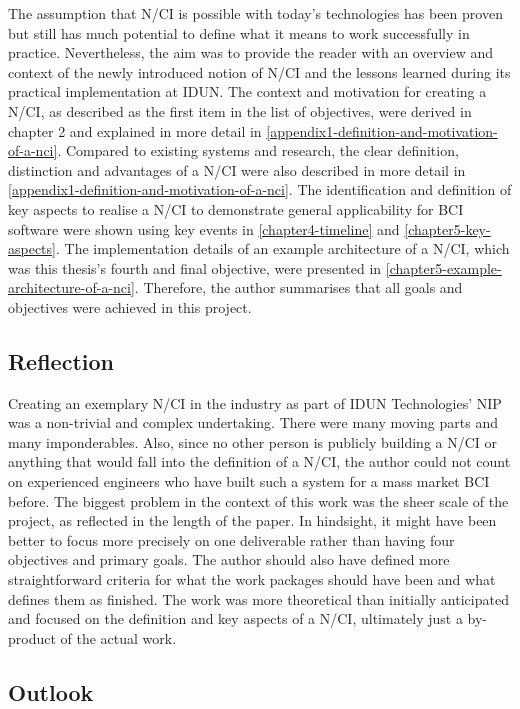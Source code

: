 The assumption that N/CI is possible with today's technologies has been proven but still has much potential to define what it means to work successfully in practice. Nevertheless, the aim was to provide the reader with an overview and context of the newly introduced notion of N/CI and the lessons learned during its practical implementation at IDUN. The context and motivation for creating a N/CI, as described as the first item in the list of objectives, were derived in chapter 2 and explained in more detail in \autoref{appendix1-definition-and-motivation-of-a-nci}. Compared to existing systems and research, the clear definition, distinction and advantages of a N/CI were also described in more detail in \autoref{appendix1-definition-and-motivation-of-a-nci}. The identification and definition of key aspects to realise a N/CI to demonstrate general applicability for BCI software were shown using key events in \autoref{chapter4-timeline} and \autoref{chapter5-key-aspects}. The implementation details of an example architecture of a N/CI, which was this thesis's fourth and final objective, were presented in \autoref{chapter5-example-architecture-of-a-nci}. Therefore, the author summarises that all goals and objectives were achieved in this project.

\subsection{Reflection}
\label{chapter5-reflection}

Creating an exemplary N/CI in the industry as part of IDUN Technologies' NIP was a non-trivial and complex undertaking. There were many moving parts and many imponderables. Also, since no other person is publicly building a N/CI or anything that would fall into the definition of a N/CI, the author could not count on experienced engineers who have built such a system for a mass market BCI before. The biggest problem in the context of this work was the sheer scale of the project, as reflected in the length of the paper. In hindsight, it might have been better to focus more precisely on one deliverable rather than having four objectives and primary goals. The author should also have defined more straightforward criteria for what the work packages should have been and what defines them as finished. The work was more theoretical than initially anticipated and focused on the definition and key aspects of a N/CI, ultimately just a by-product of the actual work.

\subsection{Outlook}
\label{chapter5-outlook}

